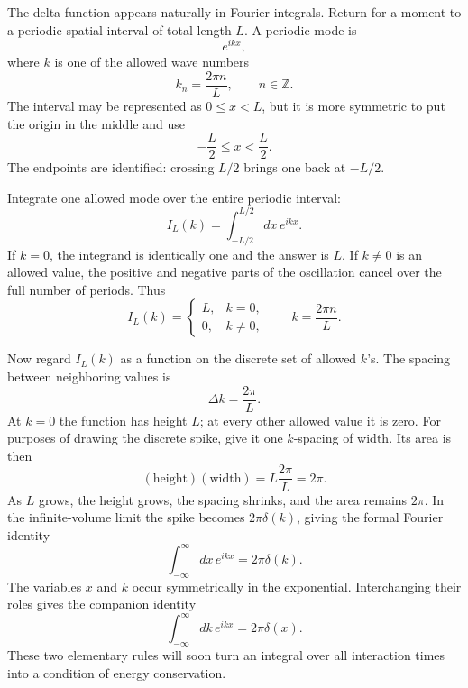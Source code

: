 The delta function appears naturally in Fourier integrals. Return for a moment to a periodic spatial interval of total length \(L\). A periodic mode is
\begin{equation}
e^{ikx},
\end{equation}
where \(k\) is one of the allowed wave numbers
\begin{equation}
k_n=\frac{2\pi n}{L},
\qquad n\in\mathbb Z.
\end{equation}
The interval may be represented as \(0\leq x<L\), but it is more symmetric to put the origin in the middle and use
\begin{equation}
-\frac L2\leq x<\frac L2.
\end{equation}
The endpoints are identified: crossing \(L/2\) brings one back at \(-L/2\).

Integrate one allowed mode over the entire periodic interval:
\begin{equation}
I_L(k)=\int_{-L/2}^{L/2}dx\,e^{ikx}.
\end{equation}
If \(k=0\), the integrand is identically one and the answer is \(L\). If \(k\neq0\) is an allowed value, the positive and negative parts of the oscillation cancel over the full number of periods. Thus
\begin{equation}
I_L(k)=
\begin{cases}
L,&k=0,\\[4pt]
0,&k\neq0,
\end{cases}
\qquad
k=\frac{2\pi n}{L}.
\end{equation}

Now regard \(I_L(k)\) as a function on the discrete set of allowed \(k\)'s. The spacing between neighboring values is
\begin{equation}
\Delta k=\frac{2\pi}{L}.
\end{equation}
At \(k=0\) the function has height \(L\); at every other allowed value it is zero. For purposes of drawing the discrete spike, give it one \(k\)-spacing of width. Its area is then
\begin{equation}
(\text{height})(\text{width})
=L\frac{2\pi}{L}=2\pi.
\end{equation}
As \(L\) grows, the height grows, the spacing shrinks, and the area remains \(2\pi\). In the infinite-volume limit the spike becomes \(2\pi\delta(k)\), giving the formal Fourier identity
\begin{equation}
\int_{-\infty}^{\infty}dx\,e^{ikx}=2\pi\delta(k).
\end{equation}
The variables \(x\) and \(k\) occur symmetrically in the exponential. Interchanging their roles gives the companion identity
\begin{equation}
\int_{-\infty}^{\infty}dk\,e^{ikx}=2\pi\delta(x).
\end{equation}
These two elementary rules will soon turn an integral over all interaction times into a condition of energy conservation.

